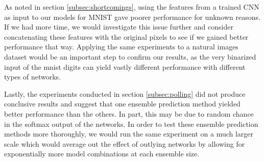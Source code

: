 \documentclass{article} %
\begin{document}
As noted in section \ref{subsec:shortcomings}, using the features from a trained CNN as input to our models for MNIST gave poorer performance for unknown reasons. If we had more time, we would investigate this issue further and consider concatenating these features with the original pixels to see if we gained better performance that way. Applying the same experiments to a natural images dataset would be an important step to confirm our results, as the very binarized input of the mnist digits can yield vastly different performance with different types of networks. 

Lastly, the experiments conducted in section \ref{subsec:polling} did not produce conclusive results and suggest that one ensemble prediction method yielded better performance than the others. In part, this may be due to random chance in the softmax output of the networks. In order to test these ensemble prediction methods more thoroughly, we would run the same experiment on a much larger scale which would average out the effect of outlying networks by allowing for exponentially more model combinations at each ensemble size.





\end{document}
